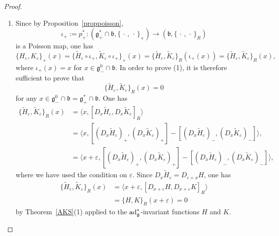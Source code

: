 \documentclass[a4paper,12pt,reqno]{amsart}%
\theoremstyle{definition}
\theoremstyle{remark}
\numberwithin{theorem}{section}
\numberwithin{equation}{section}
\newcommand{\1}{{\bf 1}}
\newcommand{\pb}{\{\,\cdot\,,\,\cdot\,\}}
\DeclareMathOperator{\ad}{\textnormal{ad}}
\newcommand{\g}{{\mathfrak g}}
\newcommand{\bg}{{\mathfrak b}}
\begin{document}
\begin{proof}
\begin{enumerate}
    \item 
    Since by Proposition~\ref{proppoisson}, \[
\iota_+:= p_+^*: \left(\g_+^*\cap\bg, \pb_+\right) \rightarrow \left(\bg, \pb_R\right)
\]
is a Poisson map, one has
\[
\{ H_\varepsilon, K_\varepsilon\}_+(x) = \{\tilde{H}_\varepsilon\circ \iota_+, \tilde{K}_\varepsilon\circ \iota_+\}_+(x) = \{\tilde{H}_\varepsilon, \tilde{K}_\varepsilon\}_R(\iota_+(x)) = \{\tilde{H}_\varepsilon, \tilde{K}_\varepsilon\}_R(x),
\]
where $\iota_+(x) = x $ for $x \in \g^0_-\cap\bg$.
In order to prove (1), it is therefore sufficient to prove that 
\[
\{\tilde{H}_\varepsilon, \tilde{K}_\varepsilon\}_R(x) = 0
\]
for any $x\in \g^0_-\cap\bg = \g^*_+\cap\bg$. One has
\begin{align*}
    \{\tilde{H}_\varepsilon, \tilde{K}_\varepsilon\}_R(x) &= \langle x, [D_x\tilde{H}_\varepsilon, D_x\tilde{K}_\varepsilon]_R\rangle\\
    & = \langle x, [(D_x\tilde{H}_\varepsilon)_+, (D_x\tilde{K}_\varepsilon)_+] - [(D_x\tilde{H}_\varepsilon)_-, (D_x\tilde{K}_\varepsilon)_-]\rangle,\\
    & = \langle x+\varepsilon, [(D_x\tilde{H}_\varepsilon)_+, (D_x\tilde{K}_\varepsilon)_+] - [(D_x\tilde{H}_\varepsilon)_-, (D_x\tilde{K}_\varepsilon)_-]\rangle,
\end{align*}
where we have used the condition on $\varepsilon$. 
Since 
$D_x \tilde{H}_\varepsilon = D_{\varepsilon+x} H$, 
one has
\begin{align*}
    \{\tilde{H}_\varepsilon, \tilde{K}_\varepsilon\}_R(x) &=  \langle x+\varepsilon, [D_{x+\varepsilon}H, D_{x+\varepsilon}K]_R \rangle\\
    & = \{ H, K\}_R(x+\varepsilon) = 0
\end{align*}
by Theorem~\ref{AKS}(1) applied to the $\ad^*_\g$-invariant functions $H$ and $K$.




\end{enumerate}
\end{proof}
\end{document}
